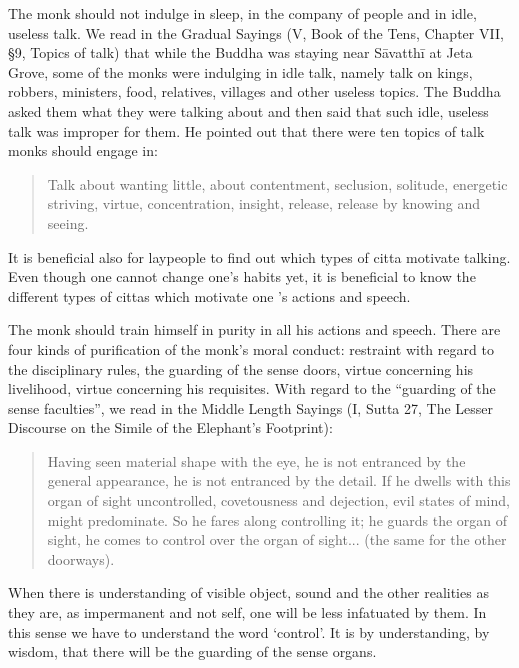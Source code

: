 \documentclass{book}
\begin{document}
The monk should not indulge in sleep, in the company of people and in
idle, useless talk. We read in the Gradual Sayings (V, Book of the Tens,
Chapter VII, §9, Topics of talk) that while the Buddha was staying near
Sāvatthī at Jeta Grove, some of the monks were indulging in idle talk,
namely talk on kings, robbers, ministers, food, relatives, villages and
other useless topics. The Buddha asked them what they were talking about
and then said that such idle, useless talk was improper for them. He
pointed out that there were ten topics of talk monks should engage in:

\begin{quote}
Talk about wanting little, about contentment, seclusion, solitude,
energetic striving, virtue, concentration, insight, release, release by
knowing and seeing.
\end{quote}

It is beneficial also for laypeople to find out which types of citta
motivate talking. Even though one cannot change one's habits yet, it is
beneficial to know the different types of cittas which motivate one 's
actions and speech.

The monk should train himself in purity in all his actions and speech.
There are four kinds of purification of the monk's moral conduct:
restraint with regard to the disciplinary rules, the guarding of the
sense doors, virtue concerning his livelihood, virtue concerning his
requisites. With regard to the ``guarding of the sense faculties'', we
read in the Middle Length Sayings (I, Sutta 27, The Lesser Discourse on
the Simile of the Elephant's Footprint):

\begin{quote}
Having seen material shape with the eye, he is not entranced by the 
general appearance, he is not entranced by the detail. If he dwells 
with this organ of sight uncontrolled, covetousness and dejection, evil states of mind, might predominate. So he fares along controlling it; he guards the organ of sight, he comes to control over the organ of 
sight...
(the same for the other doorways).

\end{quote}

When there is understanding of visible object, sound and the other
realities as they are, as impermanent and not self, one will be less
infatuated by them. In this sense we have to understand the word 
`control'. It is by understanding, by wisdom, that there will be the guarding of the sense organs.
\end{document}
